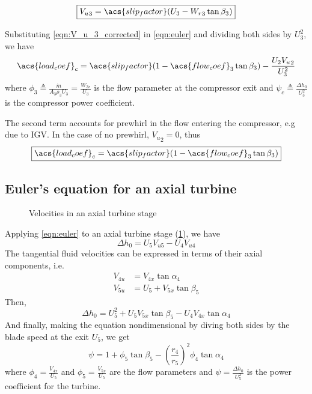 \begin{equation}
    \label{eqn:V_u_3_corrected}
    \boxed{{V_u}_3 = \acs{slip_factor}(U_3 - {W_r}_3 \tan\beta_3)}
\end{equation}

Substituting \cref{eqn:V_u_3_corrected} in \cref{eqn:euler} and dividing both sides by ${U_3^2}$, we have
\begin{equation}
    \acs{load_coef}_c = \acs{slip_factor}(1-\acs{flow_coef}_3\tan\beta_3) - \frac{U_2 {V_u}_2}{U_3^2} 
\end{equation}
where $\phi_3 \triangleq \frac{\dot{m}}{A_3 \rho_3 U_3} = \frac{W_{3r}}{U_3}$ is the flow parameter at the compressor exit
and $\psi_c \triangleq \frac{\Delta h_0}{U_3^2}$ is the compressor power coefficient.

The second term accounts for prewhirl in the flow entering the compressor, e.g due to \ac{IGV}.
In the case of no prewhirl, ${V_u}_2 = 0$, thus 
\begin{equation}
    \label{eqn:euler_compressor}
    \boxed{\acs{load_coef}_c = \acs{slip_factor}(1-\acs{flow_coef}_3\tan\beta_3)}
\end{equation}

\subsection{Euler's equation for an axial turbine}

\begin{figure}[bp]
    \caption{Velocities in an axial turbine stage}
    \label{fig:turbine_euler}
    
\end{figure}

Applying \cref{eqn:euler} to an axial turbine stage (\cref{fig:turbine_euler}), we have
\begin{equation}
    \Delta h_0 = U_5V_{u5}-U_4V_{u4}
\end{equation}
The tangential fluid velocities can be expressed in terms of their axial components, i.e.\
\begin{align}
    V_{4u} &= V_{4x} \tan\alpha_4 \\
    V_{5u} &= U_5 + V_{5x} \tan\beta_5
\end{align}
Then,
\begin{equation}
    \Delta h_0 = U_5^2 + U_5 V_{5x}\tan\beta_5 - U_4 V_{4x}\tan\alpha_4
\end{equation}
And finally, making the equation nondimensional by diving both sides by the blade speed at the exit $U_5$, we get
\begin{equation}
    \boxed{\psi = 1 + \phi_5\tan\beta_5-\left(\frac{r_4}{r_5}\right)^2\phi_4\tan\alpha_4}
\end{equation}
where $\phi_4 = \frac{V_{4x}}{U_5}$ and $\phi_5 = \frac{V_{5x}}{U_5}$ are the flow parameters and
$\psi=\frac{\Delta h_0}{U_5^2}$ is the power coefficient for the turbine.


